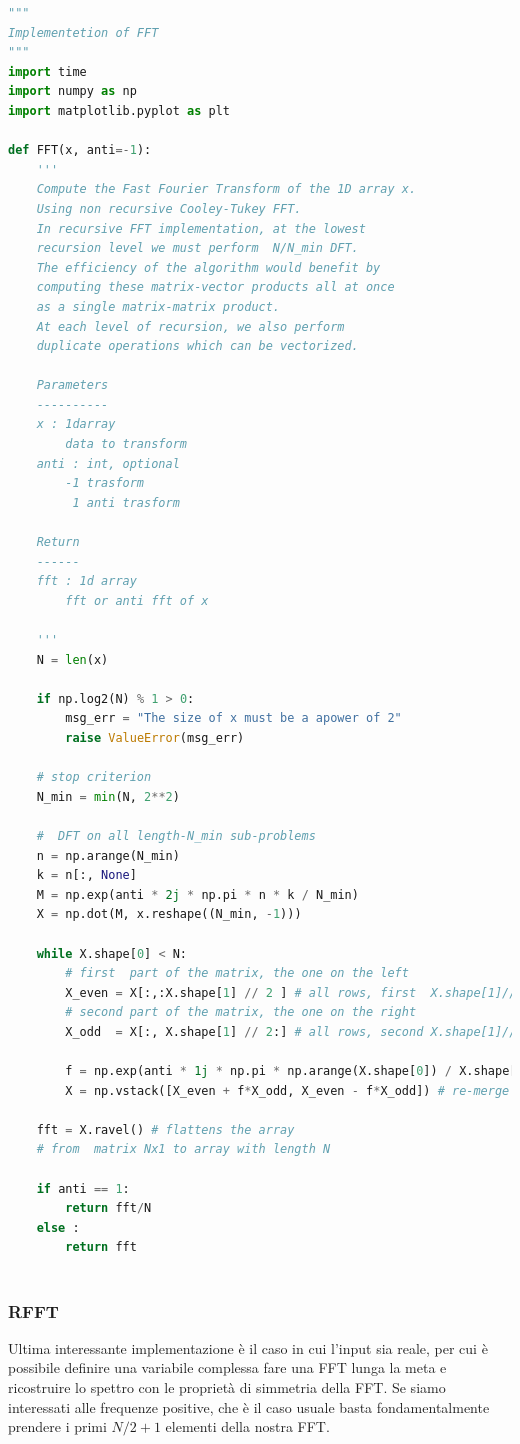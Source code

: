 \documentclass[10pt,a4paper]{article}
\begin{document}
\begin{lstlisting}[language=Python]
"""
Implementetion of FFT
"""
import time
import numpy as np
import matplotlib.pyplot as plt

def FFT(x, anti=-1):
    '''
    Compute the Fast Fourier Transform of the 1D array x.
    Using non recursive Cooley-Tukey FFT.
    In recursive FFT implementation, at the lowest
    recursion level we must perform  N/N_min DFT.
    The efficiency of the algorithm would benefit by
    computing these matrix-vector products all at once
    as a single matrix-matrix product.
    At each level of recursion, we also perform
    duplicate operations which can be vectorized.

    Parameters
    ----------
    x : 1darray
        data to transform
    anti : int, optional
        -1 trasform
         1 anti trasform

    Return
    ------
    fft : 1d array
        fft or anti fft of x

    '''
    N = len(x)

    if np.log2(N) % 1 > 0:
        msg_err = "The size of x must be a apower of 2"
        raise ValueError(msg_err)

    # stop criterion
    N_min = min(N, 2**2)

    #  DFT on all length-N_min sub-problems
    n = np.arange(N_min)
    k = n[:, None]
    M = np.exp(anti * 2j * np.pi * n * k / N_min)
    X = np.dot(M, x.reshape((N_min, -1)))

    while X.shape[0] < N:
        # first  part of the matrix, the one on the left
        X_even = X[:,:X.shape[1] // 2 ] # all rows, first  X.shape[1]//2 columns
        # second part of the matrix, the one on the right
        X_odd  = X[:, X.shape[1] // 2:] # all rows, second X.shape[1]//2 columns

        f = np.exp(anti * 1j * np.pi * np.arange(X.shape[0]) / X.shape[0])[:, None]
        X = np.vstack([X_even + f*X_odd, X_even - f*X_odd]) # re-merge the matrix

    fft = X.ravel() # flattens the array
    # from  matrix Nx1 to array with length N

    if anti == 1:
        return fft/N
    else :
        return fft
                               
\end{lstlisting}
\subsubsection{RFFT}
Ultima interessante implementazione è il caso in cui l'input sia reale, per cui è possibile definire una variabile complessa fare una FFT lunga la meta e ricostruire lo spettro con le proprietà di simmetria della FFT. Se siamo interessati alle frequenze positive, che è il caso usuale basta fondamentalmente prendere i primi $N/2 +1$ elementi della nostra FFT.
\end{document}
